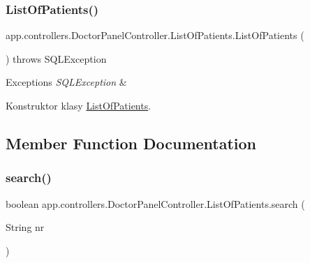 \subsubsection{\texorpdfstring{ListOfPatients()}{ListOfPatients()}}
{\footnotesize\ttfamily app.\+controllers.\+Doctor\+Panel\+Controller.\+List\+Of\+Patients.\+List\+Of\+Patients (\begin{DoxyParamCaption}{ }\end{DoxyParamCaption}) throws S\+Q\+L\+Exception}


\begin{DoxyExceptions}{Exceptions}
{\em S\+Q\+L\+Exception} & \\
\hline
\end{DoxyExceptions}
Konstruktor klasy \mbox{\hyperlink{classapp_1_1controllers_1_1_doctor_panel_controller_1_1_list_of_patients}{List\+Of\+Patients}}. 

\subsection{Member Function Documentation}
\mbox{\label{classapp_1_1controllers_1_1_doctor_panel_controller_1_1_list_of_patients_aaf2f528dced80e98416b78dd695655fb}} 
\subsubsection{\texorpdfstring{search()}{search()}}
{\footnotesize\ttfamily boolean app.\+controllers.\+Doctor\+Panel\+Controller.\+List\+Of\+Patients.\+search (\begin{DoxyParamCaption}\item[{String}]{nr }\end{DoxyParamCaption})}


